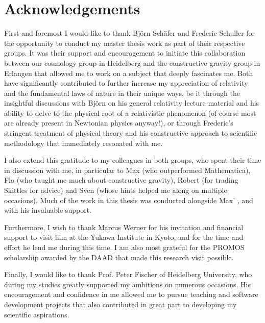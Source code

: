 \chapter{Acknowledgements}

First and foremost I would like to thank Björn Schäfer and Frederic Schuller for the opportunity to conduct my master thesis work as part of their respective groups. It was their support and encouragement to initiate this collaboration between our cosmology group in Heidelberg and the constructive gravity group in Erlangen that allowed me to work on a subject that deeply fascinates me. Both have significantly contributed to further increase my appreciation of relativity and the fundamental laws of nature in their unique ways, be it through the insightful discussions with Björn on his general relativity lecture material and his ability to delve to the physical root of a relativistic phenomenon (of course most are already present in Newtonian physics anyway!), or through Frederic's stringent treatment of physical theory and his constructive approach to scientific methodology that immediately resonated with me.

I also extend this gratitude to my colleagues in both groups, who spent their time in discussion with me, in particular to Max (who outperformed Mathematica), Flo (who taught me much about constructive gravity), Robert (for trading Skittles for advice) and Sven (whose hints helped me along on multiple occasions). Much of the work in this thesis was conducted alongside Max' , and with his invaluable support.

Furthermore, I wish to thank Marcus Werner for his invitation and financial support to visit him at the Yukawa Institute in Kyoto, and for the time and effort he lend me during this time. I am also most grateful for the PROMOS scholarship awarded by the DAAD that made this research visit possible.

Finally, I would like to thank Prof. Peter Fischer of Heidelberg University, who during my studies greatly supported my ambitions on numerous occasions. His encouragement and confidence in me allowed me to pursue teaching and software development projects that also contributed in great part to developing my scientific aspirations.

